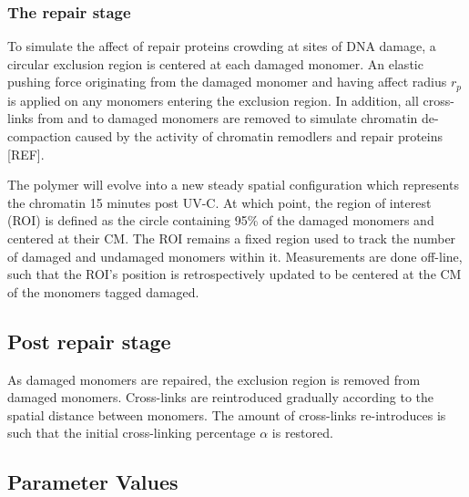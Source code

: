 \documentclass[12pt]{article}
\begin{document}
	\subsubsection{The repair stage}	
	To simulate the affect of repair proteins crowding at sites of DNA damage, a circular exclusion region is centered at each damaged monomer. An elastic pushing force originating from the damaged monomer and having affect radius $r_p$ is applied on any monomers entering the exclusion region. In addition, all cross-links from and to damaged monomers are removed to simulate chromatin de-compaction caused by the activity of chromatin remodlers and repair proteins [REF]. 
	
	The polymer will evolve into a new steady spatial configuration which represents the chromatin 15 minutes post UV-C. At which point, the region of interest (ROI) is defined as the circle containing 95\% of the damaged monomers and centered at their CM. The ROI remains a fixed region used to track the number of damaged and undamaged monomers within it. Measurements are done off-line, such that the ROI's position is retrospectively updated to be centered at the CM of the monomers tagged damaged.
	
	\subsection{Post repair stage}
	
	As damaged monomers are repaired, the exclusion region is removed from damaged monomers. Cross-links are reintroduced gradually according to the spatial distance between monomers. The amount of cross-links re-introduces is such that the initial cross-linking percentage $\alpha$ is restored. 
	
	\subsection{Parameter Values}
	
	
\end{document}
